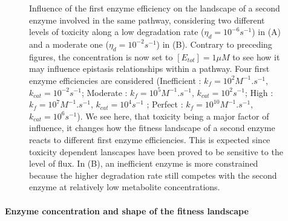 \begin{figure}[h!]
\caption{Influence of the first enzyme efficiency on the landscape of a second enzyme involved in the same pathway, considering two different levels of toxicity along a low degradation rate ($\eta_d=10^{-6}s^{-1}$) in (A) and a moderate one ($\eta_d=10^{-2}s^{-1}$) in (B). Contrary to preceding figures, the concentration is now set to $[E_{tot}]=1\mu M$ to see how it may influence epistasis relationships within a pathway. Four first enzyme efficiencies are considered (Inefficient : $k_f=10^2M^{-1}.s^{-1}$, $k_{cat}=10^{-2}s^{-1}$; Moderate : $k_f=10^5M^{-1}.s^{-1}$, $k_{cat}=10^{2}s^{-1}$; High : $k_f=10^7M^{-1}.s^{-1}$, $k_{cat}=10^{4}s^{-1}$ ; Perfect : $k_f=10^{10}M^{-1}.s^{-1}$, $k_{cat}=10^{6}s^{-1}$). We see here, that toxicity being a major factor of influence, it changes how the fitness landscape of a second enzyme reacts to different first enzyme efficiencies. This is expected since toxicity dependent lanscapes have been proved to be sensitive to the level of flux. In (B), an inefficient enzyme is more constrained because the higher degradation rate still competes with the second enzyme at relatively low metabolite concentrations.}
\label{fig11bis-ann}
\end{figure}

\noindent\paragraph{Enzyme concentration and shape of the fitness landscape}

